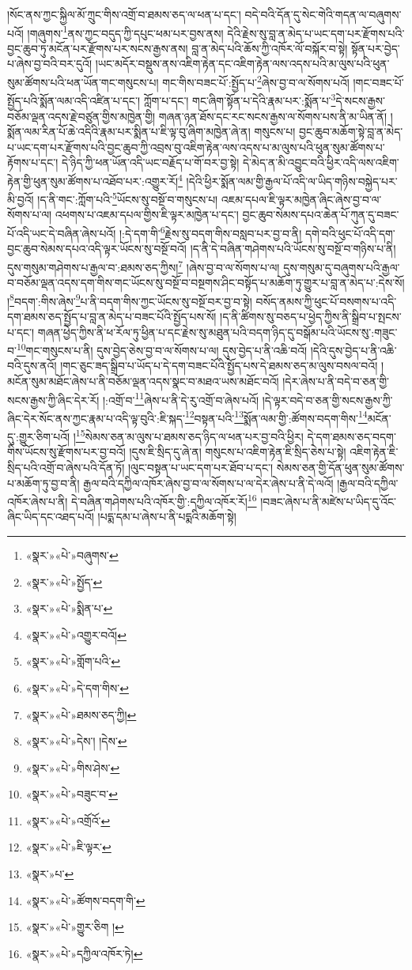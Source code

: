 །སོང་ནས་ཀྱང་སྐྱིལ་མོ་ཀྲུང་གིས་འགྲོ་བ་ཐམས་ཅད་ལ་ཕན་པ་དང་། བདེ་བའི་དོན་དུ་སེང་གེའི་གདན་ལ་བཞུགས་པའོ། །གཞུགས་\footnote{«སྣར་»«པེ་»བཞུགས་}ནས་ཀྱང་བདུད་ཀྱི་དཔུང་ཕམ་པར་བྱས་ནས། དེའི་རྗེས་སུ་བླ་ན་མེད་པ་ཡང་དག་པར་རྫོགས་པའི་བྱང་ཆུབ་ཏུ་མངོན་པར་རྫོགས་པར་སངས་རྒྱས་ནས། བླ་ན་མེད་པའི་ཆོས་ཀྱི་འཁོར་ལོ་བསྐོར་བ་སྟེ། སྟོན་པར་བྱེད་པ་ཞེས་བྱ་བའི་བར་དུའོ། །ཡང་མདོར་བསྡུས་ནས་འཇིག་རྟེན་དང་འཇིག་རྟེན་ལས་འདས་པའི་མ་ལུས་པའི་ཕུན་སུམ་ཚོགས་པའི་ཕན་ཡོན་གང་གསུངས་པ། གང་གིས་བཟང་པོ་:སྤྱོད་པ་\footnote{«སྣར་»«པེ་»སྤྱོད་}ཞེས་བྱ་བ་ལ་སོགས་པའོ། །གང་བཟང་པོ་སྤྱོད་པའི་སྨོན་ལམ་འདི་འཛིན་པ་དང་། ཀློག་པ་དང་། གང་ཞིག་སྟོན་པ་དེའི་རྣམ་པར་:སྨོན་པ་\footnote{«སྣར་»«པེ་»སྨིན་པ་}དེ་སངས་རྒྱས་བཅོམ་ལྡན་འདས་རྗེ་བཙུན་གྱིས་མཁྱེན་གྱི། གཞན་ཉན་ཐོས་དང་རང་སངས་རྒྱས་ལ་སོགས་པས་ནི་མ་ཡིན་ནོ། །སྨོན་ལམ་རིན་པོ་ཆེ་འདིའི་རྣམ་པར་སྨིན་པ་ཇི་ལྟ་བུ་ཞིག་མཁྱེན་ཞེ་ན། གསུངས་པ། བྱང་ཆུབ་མཆོག་སྟེ་བླ་ན་མེད་པ་ཡང་དག་པར་རྫོགས་པའི་བྱང་ཆུབ་ཀྱི་འབྲས་བུ་འཇིག་རྟེན་ལས་འདས་པ་མ་ལུས་པའི་ཕུན་སུམ་ཚོགས་པ་རྟོགས་པ་དང་། དེ་ཉིད་ཀྱི་ཕན་ཡོན་འདི་ཡང་བརྗོད་པ་གོ་བར་བྱ་སྟེ། དེ་མེད་ན་མི་འབྱུང་བའི་ཕྱིར་འདི་ལས་འཇིག་རྟེན་གྱི་ཕུན་སུམ་ཚོགས་པ་འཐོབ་པར་:འགྱུར་རོ།\footnote{«སྣར་»«པེ་»འགྱུར་བའོ།} །དེའི་ཕྱིར་སྨོན་ལམ་གྱི་རྒྱལ་པོ་འདི་ལ་ཡིད་གཉིས་བསྐྱེད་པར་མི་བྱའོ། །ད་ནི་གང་:ཀློག་པའི་\footnote{«སྣར་»«པེ་»གློག་པའི་}ཡོངས་སུ་བསྔོ་བ་གསུངས་པ། འཇམ་དཔལ་ཇི་ལྟར་མཁྱེན་ཞིང་ཞེས་བྱ་བ་ལ་སོགས་པ་ལ། འཕགས་པ་འཇམ་དཔལ་གྱིས་ཇི་ལྟར་མཁྱེན་པ་དང་། བྱང་ཆུབ་སེམས་དཔའ་ཆེན་པོ་ཀུན་དུ་བཟང་པོ་འདི་ཡང་དེ་བཞིན་ཞེས་པའོ། །:དེ་དག་གི་\footnote{«སྣར་»«པེ་»དེ་དག་གིས་}རྗེས་སུ་བདག་གིས་བསླབ་པར་བྱ་བ་ནི། དགེ་བའི་ཕུང་པོ་འདི་དག་བྱང་ཆུབ་སེམས་དཔའ་འདི་ལྟར་ཡོངས་སུ་བསྔོ་བའོ། །ད་ནི་དེ་བཞིན་གཤེགས་པའི་ཡོངས་སུ་བསྔོ་བ་གཉིས་པ་ནི། དུས་གསུམ་གཤེགས་པ་རྒྱལ་བ་:ཐམས་ཅད་ཀྱིས།\footnote{«སྣར་»«པེ་»ཐམས་ཅད་ཀྱི།} །ཞེས་བྱ་བ་ལ་སོགས་པ་ལ། དུས་གསུམ་དུ་བཞུགས་པའི་རྒྱལ་བ་བཅོམ་ལྡན་འདས་དག་གིས་གང་ཡོངས་སུ་བསྔོ་བ་བསྔགས་ཤིང་བསྟོད་པ་མཆོག་ཏུ་གྱུར་པ་བླ་ན་མེད་པ་:དེས་སོ། །\footnote{«སྣར་»«པེ་»དེས་། །དེས་}བདག་:གིས་ཞེས་\footnote{«སྣར་»«པེ་»གིས་ཤེས་}པ་ནི་བདག་གིས་ཀྱང་ཡོངས་སུ་བསྔོ་བར་བྱ་བ་སྟེ། བསོད་ནམས་ཀྱི་ཕུང་པོ་བསགས་པ་འདི་དག་ཐམས་ཅད་སྤྱོད་པ་བླ་ན་མེད་པ་བཟང་པོའི་སྤྱོད་པས་སོ། །ད་ནི་ཚིགས་སུ་བཅད་པ་ཕྱེད་ཀྱིས་ནི་སྒྲིབ་པ་སྤངས་པ་དང་། གཞན་ཕྱེད་ཀྱིས་ནི་ཕ་རོལ་ཏུ་ཕྱིན་པ་དང་རྗེས་སུ་མཐུན་པའི་བདག་ཉིད་དུ་བསྒོམ་པའི་ཡོངས་སུ་:གཟུང་བ་\footnote{«སྣར་»«པེ་»བཟུང་བ་}གང་གསུངས་པ་ནི། དུས་བྱེད་ཅེས་བྱ་བ་ལ་སོགས་པ་ལ། དུས་བྱེད་པ་ནི་འཆི་བའོ། །དེའི་དུས་བྱེད་པ་ནི་འཆི་བའི་དུས་ནའོ། །གང་ཅུང་ཟད་སྒྲིབ་པ་ཡོད་པ་དེ་དག་བཟང་པོའི་སྤྱོད་པས་དེ་ཐམས་ཅད་མ་ལུས་བསལ་བའོ། །མངོན་སུམ་མཐོང་ཞེས་པ་ནི་བཅོམ་ལྡན་འདས་སྣང་བ་མཐའ་ཡས་མཐོང་བའོ། །དེར་ཞེས་པ་ནི་བདེ་བ་ཅན་གྱི་སངས་རྒྱས་ཀྱི་ཞིང་དེར་རོ། །:འགྲོ་བ་\footnote{«སྣར་»«པེ་»འགྲོའོ་}ཞེས་པ་ནི་དེ་རུ་འགྲོ་བ་ཞེས་པའོ། །དེ་ལྟར་བདེ་བ་ཅན་གྱི་སངས་རྒྱས་ཀྱི་ཞིང་དེར་སོང་ནས་ཀྱང་རྣམ་པ་འདི་ལྟ་བུའི་:ཇི་སྐད་\footnote{«སྣར་»«པེ་»ཇི་ལྟར་}བསྟན་པའི་\footnote{«སྣར་»པ་}སྨོན་ལམ་གྱི་:ཚོགས་བདག་གིས་\footnote{«སྣར་»«པེ་»ཚོགས་བདག་གི་}མངོན་དུ་:གྱུར་ཅིག་པའོ། །\footnote{«སྣར་»«པེ་»གྱུར་ཅིག །}སེམས་ཅན་མ་ལུས་པ་ཐམས་ཅད་ཉིད་ལ་ཕན་པར་བྱ་བའི་ཕྱིར། དེ་དག་ཐམས་ཅད་བདག་གིས་ཡོངས་སུ་རྫོགས་པར་བྱ་བའོ། །དུས་ཇི་སྲིད་དུ་ཞེ་ན། གསུངས་པ་འཇིག་རྟེན་ཇི་སྲིད་ཅེས་པ་སྟེ། འཇིག་རྟེན་ཇི་སྲིད་པའི་འགྲོ་བ་ཞེས་པའི་དོན་ཏོ། །ལུང་བསྟན་པ་ཡང་དག་པར་ཐོབ་པ་དང་། སེམས་ཅན་གྱི་དོན་ཕུན་སུམ་ཚོགས་པ་མཆོག་ཏུ་བྱ་བ་ནི། རྒྱལ་བའི་དཀྱིལ་འཁོར་ཞེས་བྱ་བ་ལ་སོགས་པ་ལ་དེར་ཞེས་པ་ནི་དེ་ལའོ། །རྒྱལ་བའི་དཀྱིལ་འཁོར་ཞེས་པ་ནི། དེ་བཞིན་གཤེགས་པའི་འཁོར་གྱི་:དཀྱིལ་འཁོར་རོ།\footnote{«སྣར་»«པེ་»དཀྱིལ་འཁོར་ཏེ།} །བཟང་ཞེས་པ་ནི་མཛེས་པ་ཡིད་དུ་འོང་ཞིང་ཡིད་དང་འཐད་པའོ། །པདྨ་དམ་པ་ཞེས་པ་ནི་པདྨའི་མཆོག་སྟེ། 